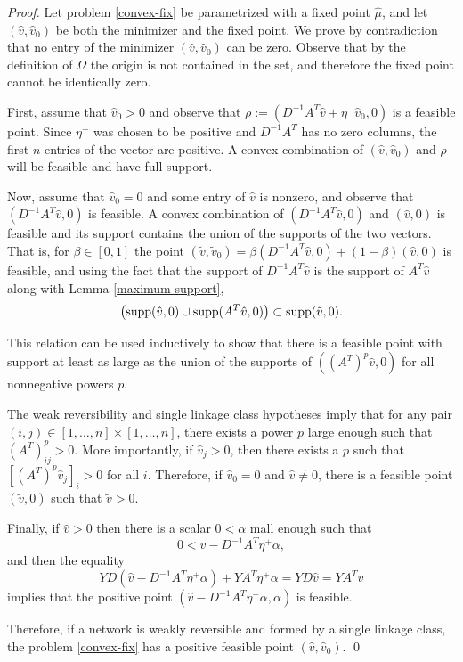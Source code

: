 \documentclass[smallextended]{svjour3}       %
\newcommand*{\supp}{\mbox{\rm supp}}
\newcommand*{\0}{\mathbf{0}}
\newcommand*{\1}{\mathbf{1}}
\begin{document}
\begin{proof}
	Let problem \eqref{convex-fix} be parametrized with a fixed point $\hat\mu$,
	and let $(\hat v, \hat v_0)$ be both the minimizer and the fixed point.  We
	prove by contradiction that no entry of the minimizer $(\hat{v},\hat{v}_0)$
	can be zero. Observe that by the definition of $\Omega$ the origin is not
	contained in the set, and therefore the fixed point cannot be identically
	zero. 

	First, assume that $\hat{v}_0>0$ and observe that $\rho := (D^{-1}A^T\hat v + \eta^-\hat v_0, 0)$ is 
	a feasible point. Since $\eta^-$ was chosen to be positive and 
	$D^{-1}A^T$ has no zero columns, the first $n$ entries 
	of the vector are positive. A convex combination of $(\hat v,\hat v_0)$ and $\rho$ will 
	be feasible and have full support.

	Now, assume that $\hat v_0 = 0$ and some entry of $\hat v$ is nonzero, and
	observe that $(D^{-1}A^T\hat{v},0)$ is feasible. A convex combination of
	$(D^{-1}A^T\hat{v},0)$ and $(\hat{v},0)$ is feasible and its support
	contains the union of the supports of the two vectors.  That is, for $\beta \in
	[0,1]$ the point  $(\tilde{v}, \tilde{v}_0) = \beta (D^{-1}A^T\hat{v},0) +
	(1-\beta)(\hat{v},0)$ is feasible, and using the fact that the support of
	$D^{-1}A^T\hat v$ is the support of $A^T	\hat v$ along with Lemma
	\ref{maximum-support},
	\begin{equation} 
		\left(\supp(\hat{v},0) \cup \supp(A^T\hat{v},0)\right) \subset \supp(\tilde{v},0).
	  \label{monotonesets} 
	\end{equation} 
	
	This relation can be used inductively to show that there is a feasible point
	with support at least as large as the union of the supports of
	$((A^T)^p\hat{v}, 0)$ for all nonnegative powers $p$.

	The weak reversibility and single linkage class hypotheses imply that for any pair
	$(i,j)\in [1,\dots,n]\times [1,\dots,n]$, there exists a power $p$ large
	enough such that $(A^T)^p_{ij}>0$.  More importantly, if $\hat v_j > 0$, then
	there exists a $p$ such that $[(A^T)^p \hat v_j]_i > 0$ for all $i$.  
	Therefore, if $\hat{v}_0 = 0$ and $\hat{v} \neq 0$, there is a 
	feasible point $(\tilde{v},0)$ such that $\tilde{v} > 0$.  
	
	Finally, if $\hat v > 0$ then there is a scalar $ 0<\alpha$ mall enough such
	that 
	\[
	0< \hat v - D^{-1}A^T\eta^+ \alpha,
	\]
	and then the equality  
	\[
		YD(\hat v - D^{-1}A^T\eta^+\alpha)+YA^T\eta^+\alpha = YD\hat v = YA^T\hat v
	\]
	implies that the positive point $(\hat v - D^{-1}A^T\eta^+\alpha,\alpha)$ is
	feasible.

	Therefore, if a network is weakly reversible and formed by a single linkage class, the
	problem \eqref{convex-fix} has a positive feasible point $(\hat v, \hat
	v_0)$.  
   \qed
\end{proof}
\end{document}
